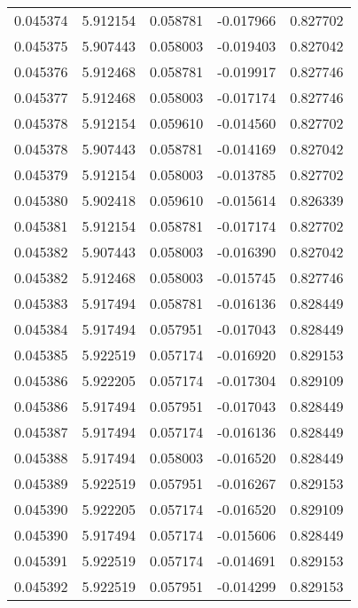 \begin{tabular}{lrrrr}
0.045374    &  5.912154 &  0.058781 & -0.017966 &             0.827702 \\
0.045375    &  5.907443 &  0.058003 & -0.019403 &             0.827042 \\
0.045376    &  5.912468 &  0.058781 & -0.019917 &             0.827746 \\
0.045377    &  5.912468 &  0.058003 & -0.017174 &             0.827746 \\
0.045378    &  5.912154 &  0.059610 & -0.014560 &             0.827702 \\
0.045378    &  5.907443 &  0.058781 & -0.014169 &             0.827042 \\
0.045379    &  5.912154 &  0.058003 & -0.013785 &             0.827702 \\
0.045380    &  5.902418 &  0.059610 & -0.015614 &             0.826339 \\
0.045381    &  5.912154 &  0.058781 & -0.017174 &             0.827702 \\
0.045382    &  5.907443 &  0.058003 & -0.016390 &             0.827042 \\
0.045382    &  5.912468 &  0.058003 & -0.015745 &             0.827746 \\
0.045383    &  5.917494 &  0.058781 & -0.016136 &             0.828449 \\
0.045384    &  5.917494 &  0.057951 & -0.017043 &             0.828449 \\
0.045385    &  5.922519 &  0.057174 & -0.016920 &             0.829153 \\
0.045386    &  5.922205 &  0.057174 & -0.017304 &             0.829109 \\
0.045386    &  5.917494 &  0.057951 & -0.017043 &             0.828449 \\
0.045387    &  5.917494 &  0.057174 & -0.016136 &             0.828449 \\
0.045388    &  5.917494 &  0.058003 & -0.016520 &             0.828449 \\
0.045389    &  5.922519 &  0.057951 & -0.016267 &             0.829153 \\
0.045390    &  5.922205 &  0.057174 & -0.016520 &             0.829109 \\
0.045390    &  5.917494 &  0.057174 & -0.015606 &             0.828449 \\
0.045391    &  5.922519 &  0.057174 & -0.014691 &             0.829153 \\
0.045392    &  5.922519 &  0.057951 & -0.014299 &             0.829153 \\

\end{tabular}
